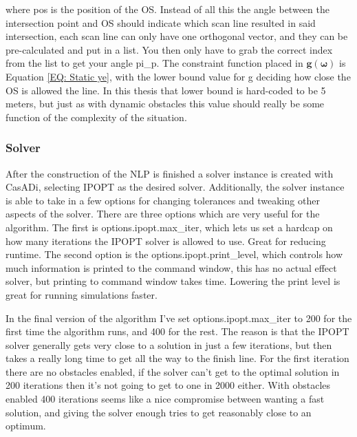 where pos is the position of the OS. Instead of all this the angle between the intersection point and OS should indicate which scan line resulted
in said intersection, each scan line can only have one orthogonal vector, and they can be pre-calculated and put in a list. You then only have to grab the correct index
from the list to get your angle pi\_p. The constraint function placed in $\textbf{g}(\bm{\omega})$ is Equation \eqref{EQ: Static ye}, with the lower
bound value for g deciding how close the \gls{OS} is allowed the line. In this thesis that lower bound is hard-coded to be 5 meters, but just as with dynamic obstacles
this value should really be some function of the complexity of the situation.



\subsubsection*{Solver}
After the construction of the \gls{NLP} is finished a solver instance is created with CasADi, selecting \gls{IPOPT}
as the desired solver. Additionally, the solver instance is able to take in a few options for changing tolerances
and tweaking other aspects of the solver. There are three options which are very useful for the algorithm. 
The first is options.ipopt.max\_iter, which lets us set a hardcap on how many iterations the \gls{IPOPT} solver is 
allowed to use. Great for reducing runtime. The second option is the options.ipopt.print\_level, which controls 
how much information is printed to the command window, this has no actual effect solver, 
but printing to command window takes time. Lowering the print level is great for running simulations faster.

In the final version of the algorithm I've set options.ipopt.max\_iter to 200 for the first time 
the algorithm runs, and 400 for the rest. The reason is that the \gls{IPOPT} solver generally gets very close
to a solution in just a few iterations, but then takes a really long time to get all the way to the finish line.
For the first iteration there are no obstacles enabled, if the solver can't get to the optimal solution in 200 iterations
then it's not going to get to one in 2000 either. With obstacles enabled 400 iterations seems like a nice compromise between
wanting a fast solution, and giving the solver enough tries to get reasonably close to an optimum. 

